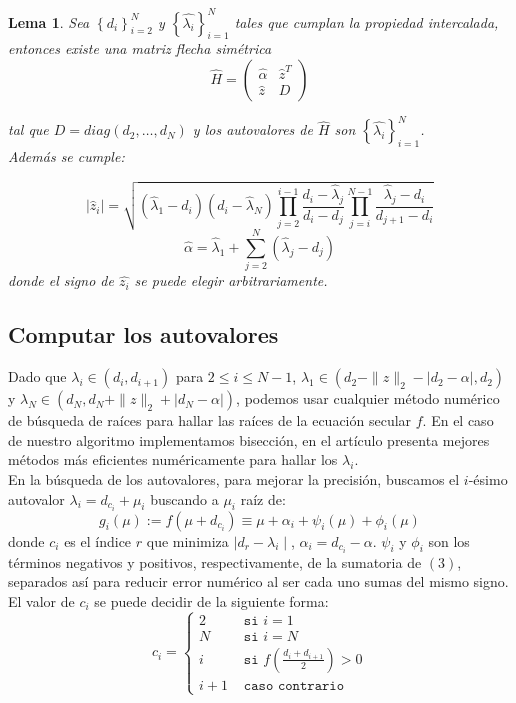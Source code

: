 \documentclass[11pt,a4paper]{article}
\newcommand{\Sum}{\sum\limits}
\newcommand{\Prod}{\prod\limits}
\newtheorem{lema}{Lema}
\begin{document}
\begin{lema}
    Sea $\left \lbrace d_i\right \rbrace_{i=2}^N$ y $\left \lbrace \hat{\lambda_i} \right \rbrace_{i=1}^N$ tales que cumplan la propiedad intercalada, entonces existe una matriz flecha simétrica 
    $$\hat{H}=\begin{pmatrix}
        \hat{\alpha} & \hat{z}^T \\
        \hat{z} & D
    \end{pmatrix}$$
    
    tal que $D=diag(d_2, \dots, d_N)$ y los autovalores de $\hat{H}$ son $\left \lbrace \hat{\lambda_i} \right \rbrace_{i=1}^N$.\\
    Además se cumple:
    
    \begin{equation}
        |\hat{z}_i|= \sqrt{ (\hat{\lambda}_1 - d_i) (d_i-\hat{\lambda}_N) \Prod_{j=2}^{i-1} \frac{d_i -\hat{\lambda}_j}{d_i - d_j} \Prod_{j=i}^{N-1} \frac{\hat{\lambda}_j- d_i}{d_{j+1} -d_i} }
    \end{equation}
    \begin{equation}
        \hat{\alpha}= \hat{\lambda}_1 + \Sum_{j=2}^N  (\hat{\lambda}_j -d_j)
    \end{equation}
    donde el signo de $\hat{z_i}$ se puede elegir arbitrariamente.
\end{lema}


\subsection{Computar los autovalores}

Dado que $\lambda_i \in (d_i, d_{i+1})$ para $2\leq i \leq N-1$, $\lambda_1 \in \left(d_2-\|z\|_2 -|d_2-\alpha| , d_2 \right) $ y $\lambda_N \in \left(d_N, d_N+\|z\|_2 + |d_N-\alpha| \right)$, podemos usar cualquier método numérico de búsqueda de raíces para hallar las raíces de la ecuación secular $f$. En el caso de nuestro algoritmo implementamos bisección, en el artículo \cite{gu1995} presenta mejores métodos más eficientes numéricamente para hallar los $\lambda_i$. \\

En la búsqueda de los autovalores, para mejorar la precisión, buscamos el $i$-ésimo autovalor $\lambda_i=d_{c_i}+\mu_i$ buscando a $\mu_i$ raíz de:
$$g_i(\mu):=f(\mu+d_{c_i})\equiv \mu +\alpha_i +\psi_i(\mu) + \phi_i(\mu)$$
donde $c_i$ es el índice $r$ que minimiza $\mid d_r - \lambda_i \mid$, $\alpha_i=d_{c_i}-\alpha$.  $\psi_i$ y $\phi_i$ son los términos negativos y positivos, respectivamente, de la sumatoria de $(3)$, separados así para reducir error numérico al ser cada uno sumas del mismo signo. El valor de $c_i$ se puede decidir de la siguiente forma:\\
\small
$$c_i=\begin{cases} 
    2 & \texttt{ si $i=1$}\\
    N & \texttt{ si $i=N$}\\
    i & \texttt{ si $f\left(\frac{d_i+d_{i+1}}2\right)>0$}\\
    i+1 & \texttt{ caso contrario}
\end{cases}$$
\end{document}
